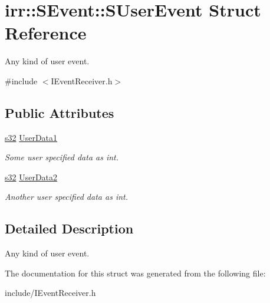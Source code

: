 \hypertarget{structirr_1_1SEvent_1_1SUserEvent}{}\section{irr\+:\+:S\+Event\+:\+:S\+User\+Event Struct Reference}
\label{structirr_1_1SEvent_1_1SUserEvent}


Any kind of user event.  




{\ttfamily \#include $<$I\+Event\+Receiver.\+h$>$}

\subsection*{Public Attributes}
\begin{DoxyCompactItemize}
\item 
\hyperlink{namespaceirr_ac66849b7a6ed16e30ebede579f9b47c6}{s32} \hyperlink{structirr_1_1SEvent_1_1SUserEvent_adb57182c0dce9791b1ac67baea96d5b8}{User\+Data1}\hypertarget{structirr_1_1SEvent_1_1SUserEvent_adb57182c0dce9791b1ac67baea96d5b8}{}\label{structirr_1_1SEvent_1_1SUserEvent_adb57182c0dce9791b1ac67baea96d5b8}

\begin{DoxyCompactList}\small\item\em Some user specified data as int. \end{DoxyCompactList}\item 
\hyperlink{namespaceirr_ac66849b7a6ed16e30ebede579f9b47c6}{s32} \hyperlink{structirr_1_1SEvent_1_1SUserEvent_a13214839a30e63bcee17f94f0df395d8}{User\+Data2}\hypertarget{structirr_1_1SEvent_1_1SUserEvent_a13214839a30e63bcee17f94f0df395d8}{}\label{structirr_1_1SEvent_1_1SUserEvent_a13214839a30e63bcee17f94f0df395d8}

\begin{DoxyCompactList}\small\item\em Another user specified data as int. \end{DoxyCompactList}\end{DoxyCompactItemize}


\subsection{Detailed Description}
Any kind of user event. 

The documentation for this struct was generated from the following file\+:\begin{DoxyCompactItemize}
\item 
include/I\+Event\+Receiver.\+h\end{DoxyCompactItemize}
